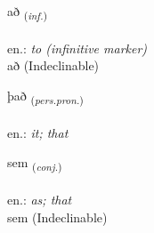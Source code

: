 \documentclass[frontgrid, backgrid]{flacards}\usepackage[]{graphicx}\usepackage[]{xcolor}
\begin{document}
{að \small{\textsubscript{(\textit{inf.})}} \\[1ex]
\textphonetic{[aːð]} \\
en.: \emph{to (infinitive marker)} \\  [2ex]
að (Indeclinable)}

\renewcommand{\flhead}{\vskip5pt \fboxsep=0pt {\small\bfseries\footnotesize Fornafn | Pronoun}}
\renewcommand{\fcfoot}{\vskip5pt \fboxsep=0pt \hspace{2pt}{\small\bfseries\footnotesize 1K}}

\renewcommand{\blhead}{\vskip5pt {\small\bfseries\footnotesize Fornafn | Pronoun }}
\renewcommand{\bcfoot}{\vskip5pt \hspace{2pt}{\small\bfseries\footnotesize 1K}}


{það \small{\textsubscript{(\textit{pers.pron.})}} \\[1ex] %
\textphonetic{[θaːð]} \\
en.: \emph{it; that} \\  [2ex]
\renewcommand*{\arraystretch}{0.8}
}


\renewcommand{\flhead}{\vskip5pt \fboxsep=0pt {\small\bfseries\footnotesize Samtenging | Conjuction}}
\renewcommand{\fcfoot}{\vskip5pt \fboxsep=0pt \hspace{2pt}{\small\bfseries\footnotesize 1K}}

\renewcommand{\blhead}{\vskip5pt {\small\bfseries\footnotesize Samtenging | Conjuction }}
\renewcommand{\bcfoot}{\vskip5pt \hspace{2pt}{\small\bfseries\footnotesize 1K}}


{sem \small{\textsubscript{(\textit{conj.})}} \\[1ex]
\textphonetic{[sɛːm]} \\
en.: \emph{as; that} \\  [2ex]
sem (Indeclinable)}
\end{document}
